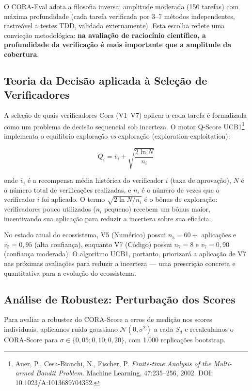 O CORA-Eval adota a filosofia inversa: amplitude moderada (150 tarefas) com
máxima profundidade (cada tarefa verificada por 3--7 métodos independentes,
rastreável a testes TDD, validada externamente). Esta escolha reflete uma
convicção metodológica: \textbf{na avaliação de raciocínio científico, a
profundidade da verificação é mais importante que a amplitude da cobertura}.

\subsection{Teoria da Decisão aplicada à Seleção de Verificadores}

A seleção de quais verificadores Cora (V1--V7) aplicar a cada tarefa é
formalizada como um problema de decisão sequencial sob incerteza. O motor
Q-Score UCB1\footnote{Auer, P., Cesa-Bianchi, N., Fischer, P. \textit{Finite-time
Analysis of the Multi-armed Bandit Problem}. Machine Learning, 47:235--256,
2002. DOI: 10.1023/A:1013689704352.} implementa o equilíbrio exploração
\textit{vs} exploração (exploration-exploitation):

\[
Q_i = \bar{v}_i + \sqrt{\frac{2\ln N}{n_i}}
\]

onde $\bar{v}_i$ é a recompensa média histórica do verificador $i$ (taxa de
aprovação), $N$ é o número total de verificações realizadas, e $n_i$ é o
número de vezes que o verificador $i$ foi aplicado. O termo $\sqrt{2\ln N /
n_i}$ é o bônus de exploração: verificadores pouco utilizados ($n_i$ pequeno)
recebem um bônus maior, incentivando sua aplicação para reduzir a incerteza
sobre sua eficácia.

No estado atual do ecossistema, V5 (Numérico) possui $n_5 = 60+$ aplicações
e $\bar{v}_5 = 0,95$ (alta confiança), enquanto V7 (Código) possui $n_7 = 8$
e $\bar{v}_7 = 0,90$ (confiança moderada). O algoritmo UCB1, portanto,
priorizará a aplicação de V7 nas próximas avaliações para reduzir a incerteza
--- uma prescrição concreta e quantitativa para a evolução do ecossistema.

\subsection{Análise de Robustez: Perturbação dos Scores}

Para avaliar a robustez do CORA-Score a erros de medição nos scores
individuais, aplicamos ruído gaussiano $\mathcal{N}(0, \sigma^2)$ a cada
$S_d$ e recalculamos o CORA-Score para $\sigma \in \{0,05; 0,10; 0,20\}$,
com 1.000 replicações bootstrap.

